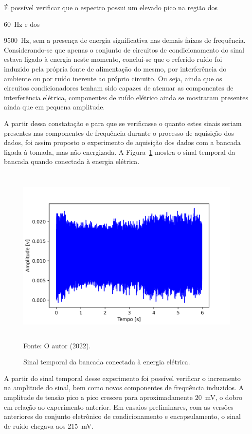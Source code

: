 \documentclass[
	12pt,				
	oneside,			
	a4paper,			
	english,			
	brazil,			
	]{abntex2ppgsi}
\begin{document}
É possível verificar que o espectro possui um elevado pico na região dos {\SI{60}{\hertz} e dos {\SI{9500}{\hertz}, sem a presença de energia significativa nas demais faixas de frequência. Considerando-se que apenas o conjunto de circuitos de condicionamento do sinal estava ligado à energia neste momento, conclui-se que o referido ruído foi induzido pela própria fonte de alimentação do mesmo, por interferência do ambiente ou por ruído inerente ao próprio circuito. Ou seja, ainda que os circuitos condicionadores tenham sido capazes de atenuar as componentes de interferência elétrica, componentes de ruído elétrico ainda se mostraram presentes ainda que em pequena amplitude. 

A partir dessa constatação e para que se verificasse o quanto estes sinais seriam presentes nas componentes de frequência durante o processo de aquisição dos dados, foi assim proposto o experimento de aquisição dos dados com a bancada ligada à tomada, mas não energizada. A Figura~\ref{maquina_ligada_na_tomada} mostra o sinal temporal da bancada quando conectada à energia elétrica.

\begin{figure}[H]
\centering
\caption {Sinal temporal da bancada conectada à energia elétrica.}
\includegraphics[width=\textwidth,height=90mm,keepaspectratio]{aquisicao_02_maquina_ligada_tomada_10_03_2022_08h55min_ajustado_6s} \\
Fonte: O autor (2022).
\label{maquina_ligada_na_tomada}
\end{figure} 

A partir do sinal temporal desse experimento foi possível verificar o incremento na amplitude do sinal, bem como novos componentes de frequência induzidos. A amplitude de tensão pico a pico cresceu para aproximadamente {\SI{20}{\milli\volt}}, o dobro em relação ao experimento anterior. Em ensaios preliminares, com as versões anteriores do conjunto eletrônico de condicionamento e encapsulamento, o sinal de ruído chegava aos {\SI{215}{\milli\volt}}. 

}}
\end{document}

